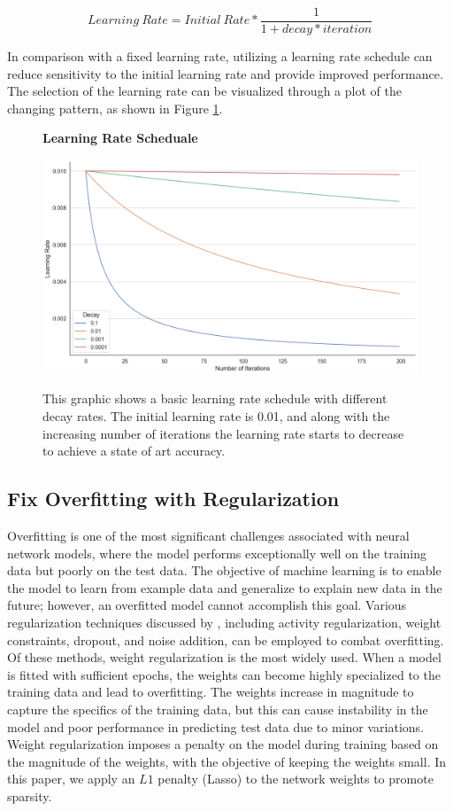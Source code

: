 \begin{equation}
  \label{eqn:learningrate}
  Learning \ Rate = Initial \ Rate * \frac{1}{1 + decay * iteration}
  \end{equation}

\noindent In comparison with a fixed learning rate, utilizing a learning rate schedule can reduce sensitivity to the initial learning rate and provide improved performance. The selection of the learning rate can be visualized through a plot of the changing pattern, as shown in Figure \ref{fig: learningrate}.

\begin{figure}[H]
  \centering
  \caption{\textbf{Learning Rate Scheduale}}
  \includegraphics[width=.8\textwidth]{images/learning rate decay.png}
  \label{fig: learningrate}
  \caption*{\footnotesize{This graphic shows a basic learning rate schedule with different decay rates.  The initial learning rate is 0.01, and along with the increasing number of iterations the learning rate starts to decrease to achieve a state of art accuracy.}}
\end{figure}

\subsection{Fix Overfitting with Regularization}

Overfitting is one of the most significant challenges associated with neural network models, where the model performs exceptionally well on the training data but poorly on the test data. The objective of machine learning is to enable the model to learn from example data and generalize to explain new data in the future; however, an overfitted model cannot accomplish this goal. Various regularization techniques discussed by \citet*{tian2022comprehensive}, including activity regularization, weight constraints, dropout, and noise addition, can be employed to combat overfitting. Of these methods, weight regularization is the most widely used. When a model is fitted with sufficient epochs, the weights can become highly specialized to the training data and lead to overfitting. The weights increase in magnitude to capture the specifics of the training data, but this can cause instability in the model and poor performance in predicting test data due to minor variations. Weight regularization imposes a penalty on the model during training based on the magnitude of the weights, with the objective of keeping the weights small. In this paper, we apply an $L1$ penalty (Lasso) to the network weights to promote sparsity.

